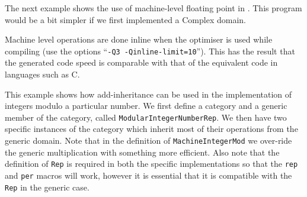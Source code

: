 \newpage
{}

The next example shows the use of machine-level floating point in \asharp.  
This program would be a bit simpler if we first implemented a Complex
domain.


Machine level operations are done inline when the optimiser is used
while compiling (use the options ``{\tt -Q3 -Qinline-limit=10}'').
This has the result that the generated code speed is
comparable with that of the equivalent code in languages such as C.

\newpage
{}

This example shows how add-inheritance can be used in the
implementation of integers modulo a particular number.  We first
define a category and a generic member of the category, called
{\tt ModularIntegerNumberRep}.  We then have two specific instances of the
category which inherit most of their operations from the generic
domain.  Note that in the definition of {\tt MachineIntegerMod} we
over-ride the generic multiplication with something more efficient.
Also note that the definition of {\tt Rep} is required in both the specific
implementations so that the {\tt rep} and {\tt per} macros will work,
however it is essential that it is compatible with the {\tt Rep} in
the generic case.


